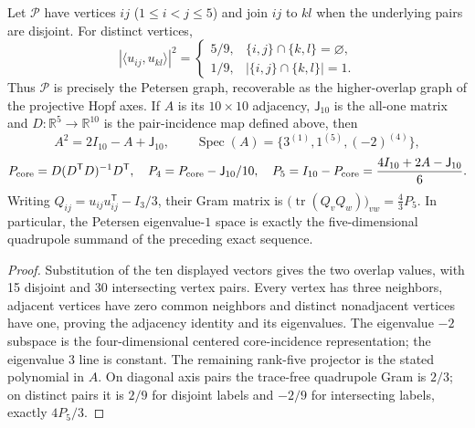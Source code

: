 \documentclass[11pt]{article}
\begin{document}
\begin{theorem}
\label{p1:thm:petersen-angular-quadrupole}
Let $\mathcal P$ have vertices $ij$ ($1\le i<j\le5$) and join $ij$ to
$kl$ when the underlying pairs are disjoint. For distinct vertices,
\[
 |\langle u_{ij},u_{kl}\rangle|^2=
 \begin{cases}5/9,&\{i,j\}\cap\{k,l\}=\varnothing,\\
 1/9,&|\{i,j\}\cap\{k,l\}|=1.
 \end{cases}
\]
Thus $\mathcal P$ is precisely the Petersen graph, recoverable as the
higher-overlap graph of the projective Hopf axes. If $A$ is its
$10\times10$ adjacency, $\mathsf J_{10}$ is the all-one matrix and
$D:\mathbb R^5\to\mathbb R^{10}$ is the pair-incidence map defined
above, then
\[
 A^2=2I_{10}-A+\mathsf J_{10},\qquad
 \operatorname{Spec}(A)=\{3^{(1)},1^{(5)},(-2)^{(4)}\},
\]
\[
 P_{\rm core}=D(D^{\mathsf T}D)^{-1}D^{\mathsf T},\quad
 P_4=P_{\rm core}-\mathsf J_{10}/10,\quad
 P_5=I_{10}-P_{\rm core}
     ={4I_{10}+2A-\mathsf J_{10}\over6}.
\]
Writing $Q_{ij}=u_{ij}u_{ij}^{\mathsf T}-I_3/3$, their Gram matrix is
$\big(\operatorname{tr}(Q_vQ_w)\big)_{vw}=\tfrac43P_5$.
In particular, the Petersen eigenvalue-$1$ space is exactly the
five-dimensional quadrupole summand of the preceding exact sequence.
\end{theorem}
\begin{proof}
Substitution of the ten displayed vectors gives the two overlap
values, with 15 disjoint and 30 intersecting vertex pairs. Every
vertex has three neighbors, adjacent vertices have zero common
neighbors and distinct nonadjacent vertices have one, proving the
adjacency identity and its eigenvalues. The eigenvalue $-2$ subspace
is the four-dimensional centered core-incidence representation;
the eigenvalue $3$ line is constant. The remaining rank-five projector
is the stated polynomial in $A$. On diagonal axis pairs the trace-free
quadrupole Gram is $2/3$; on distinct pairs it is $2/9$ for disjoint
labels and $-2/9$ for intersecting labels, exactly $4P_5/3$.
\end{proof}
\end{document}
